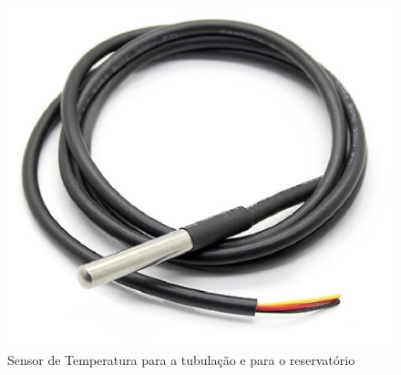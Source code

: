 \begin{figure}[!htb]                   
	\centering                          
	\includegraphics[scale=0.5]{figuras/Figura4.eps}
	\caption{Sensor de Temperatura para a tubulação e para o reservatório}               
\end{figure}
